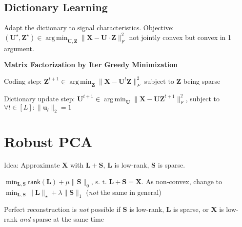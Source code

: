 \documentclass[a4paper, 11pt, landscape]{article}
\DeclareMathOperator*{\argmin}{arg\,min}
\begin{document}
\begin{multicols*}{3}

    \subsection{Dictionary Learning}
    Adapt the dictionary to signal characteristics. Objective: $(\mathbf{U}^\star, \mathbf{Z}^\star) \in \argmin_\mathbf{U,Z} \| \mathbf{X} - \mathbf{U} \cdot \mathbf{Z} \|_F^2$ not jointly convex but convex in 1 argument.

    \textbf{Matrix Factorization by Iter Greedy Minimization}
    \begin{inparaenum}
    \item Coding step: $\mathbf{Z}^{t+1} \in \argmin_\mathbf{Z} \| \mathbf{X} - \mathbf{U}^t \mathbf{Z} \|_F^2$ subject to $\mathbf{Z}$ being sparse
    \item Dictionary update step: $\mathbf{U}^{t+1} \in \argmin_\mathbf{U} \| \mathbf{X} - \mathbf{UZ}^{t+1} \|_F^2$, subject to $\forall l\in [L]:\|\mathbf{u}_l\|_2 = 1$
    \end{inparaenum}

    \section{Robust PCA}
    \begin{compactitem}
    \item Idea: Approximate $\mathbf{X}$ with $\mathbf{L} + \mathbf{S}$, $\mathbf{L}$ is low-rank, $\mathbf{S}$ is sparse.
    \item $\min_{\mathbf{L},\mathbf{S}}\mathsf{rank}(\mathbf{L}) + \mu \lVert \mathbf{S}\rVert_0$, s. t. $\mathbf{L} + \mathbf{S} = \mathbf{X}$. As non-convex, change to $\min_{\mathbf{L},\mathbf{S}} \|\mathbf{L}\|_\star + \lambda \lVert\mathbf{S}\rVert_1$ (\emph{not} the same in general)
    \item Perfect reconstruction is \emph{not} possible if $\mathbf{S}$ is low-rank, $\mathbf{L}$ is sparse, or $\mathbf{X}$ is low-rank \textit{and} sparse at the same time
    \end{compactitem}


\end{multicols*}
\end{document}
